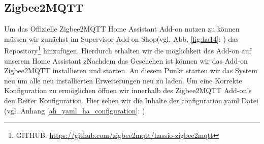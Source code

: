 \subsection{Zigbee2MQTT}
Um das Offizielle Zigbee2MQTT Home Assistant Add-on nutzen zu können müssen wir zunächst im Supervisor Add-on Shop(vgl. Abb, \ref{fig:ha14}: ) das Repository\footnote{GITHUB: \url{https://github.com/zigbee2mqtt/hassio-zigbee2mqtt}} hinzufügen. Hierdurch erhalten wir die möglichkeit das Add-on auf unserem Home Assistant zNachdem das Geschehen ist können wir das Add-on Zigbee2MQTT installieren und starten. An diesem Punkt starten wir das System neu um alle neu installierten Erweiterungen neu zu laden.
Um eine Korrekte Konfiguration zu ermöglichen öffnen wir innerhalb des Zigbee2MQTT Add-on's den Reiter Konfiguration. Hier sehen wir die Inhalte der configuration.yaml Datei (vgl. Anhang \ref{ah_yaml_ha_configuration}: )

